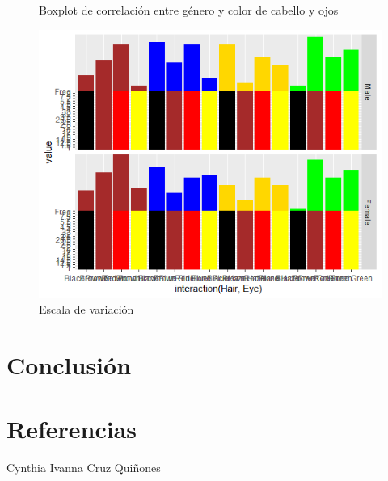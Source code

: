 \documentclass[12pt,a4paper]{article}
\begin{document}
\begin{figure}
 \centering
 \caption{Boxplot de correlación entre género y color de cabello y ojos}
 \label{f:Boxplot}
\end{figure}


\begin{figure}
\centering
\includegraphics[scale=0.8]{Escala}
\caption{Escala de variación}
\label{fig:Escala}
\end{figure}

\newpage
\section{Conclusión}


\newpage

\section{Referencias}

Cynthia Ivanna Cruz Quiñones\citep{repositorio}



\end{document}
